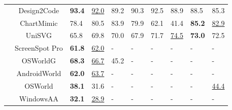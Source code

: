 {\begin{table}[htp]
\begin{adjustbox}{max width=1\textwidth}
\begin{NiceTabular}{c|c|w{c}{1cm}w{c}{1cm}|w{c}{1cm}w{c}{1cm}|w{c}{1cm}w{c}{1cm}|w{c}{1cm}w{c}{1cm}}
&Design2Code    & \textbf{93.4} & \underline{92.0} & 89.2 & 90.3 & 92.5 & 88.9 & 88.5 & 85.3 \\
&ChartMimic     & 78.4 & 80.5 & 83.9 & 79.9 & 62.1 & 41.4 & \textbf{85.2} & \underline{82.9} \\
&UniSVG         & 65.8 & 69.8 & 70.0 & 67.9 & 71.7 & \underline{74.5} & \textbf{73.0} & 72.5 \\
\midrule
{}
&ScreenSpot Pro  & \textbf{61.8} & \underline{62.0} &  - & - & - & - & - & - \\
&OSWorldG & \textbf{68.3} & \underline{66.7} & 45.2 & - & - & - & - & - \\
&AndroidWorld & \textbf{62.0} & \underline{63.7} & - & - & - & - & - & - \\
&OSWorld & \textbf{38.1} & 31.6 & - & - & - & - & - & \underline{44.4} \\
&WindowsAA &\textbf{32.1} & \underline{28.9}& - & - & - & - & - & - \\
\bottomrule
\end{NiceTabular}
\end{adjustbox}
\renewcommand{\arraystretch}{1.0} 
\end{table}
}
